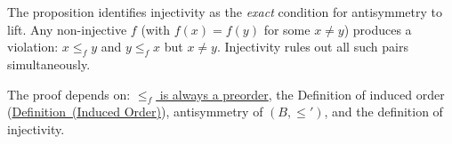 \begin{remark*}
The proposition identifies injectivity as the \emph{exact} condition for
antisymmetry to lift. Any non-injective $f$ (with $f(x) = f(y)$ for some $x
\neq y$) produces a violation: $x \leq_f y$ and $y \leq_f x$ but $x \neq y$.
Injectivity rules out all such pairs simultaneously.
\end{remark*}

\begin{remark*}[Dependencies]
The proof depends on: \hyperref[prop:induced-preorder]{$\leq_f$ is always a
preorder}, the Definition of induced order
(\hyperref[def:induced-order]{Definition~(Induced Order)}), antisymmetry of
$(B, \leq')$, and the definition of injectivity.
\end{remark*}
